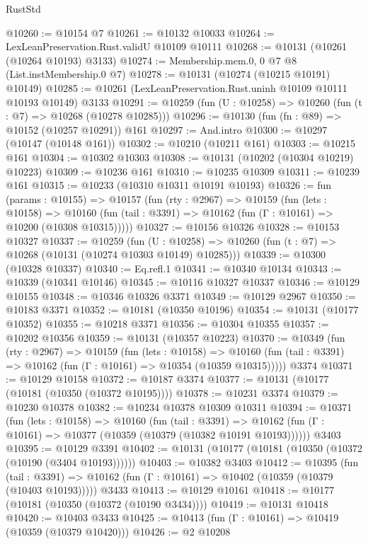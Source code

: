 \begin{lexlean}{RustStd}
\begin{coremodule}
@10260 := @10154 @7
@10261 := @10132 @10033
@10264 := LexLeanPreservation.Rust.validU @10109 @10111
@10268 := @10131 (@10261 (@10264 @10193) @3133)
@10274 := Membership.mem.{0, 0} @7 @8 (List.instMembership.{0} @7)
@10278 := @10131 (@10274 (@10215 @10191) @10149)
@10285 := @10261 (LexLeanPreservation.Rust.uninh @10109 @10111 @10193 @10149) @3133
@10291 := @10259 (fun (U : @10258) => @10260 (fun (t : @7) => @10268 (@10278 @10285)))
@10296 := @10130 (fun (fn : @89) => @10152 (@10257 @10291)) @161
@10297 := And.intro
@10300 := @10297 (@10147 (@10148 @161))
@10302 := @10210 (@10211 @161)
@10303 := @10215 @161
@10304 := @10302 @10303
@10308 := @10131 (@10202 (@10304 @10219) @10223)
@10309 := @10236 @161
@10310 := @10235 @10309
@10311 := @10239 @161
@10315 := @10233 (@10310 @10311 @10191 @10193)
@10326 := fun (params : @10155) =>
  @10157
    (fun (rty : @2967) =>
    @10159
      (fun (lets : @10158) =>
      @10160 (fun (tail : @3391) => @10162 (fun (Γ : @10161) => @10200 (@10308 @10315)))))
@10327 := @10156 @10326
@10328 := @10153 @10327
@10337 := @10259
    (fun (U : @10258) => @10260 (fun (t : @7) => @10268 (@10131 (@10274 @10303 @10149) @10285)))
@10339 := @10300 (@10328 @10337)
@10340 := Eq.refl.{1}
@10341 := @10340 @10134
@10343 := @10339 (@10341 @10146)
@10345 := @10116 @10327 @10337
@10346 := @10129 @10155
@10348 := @10346 @10326 @3371
@10349 := @10129 @2967
@10350 := @10183 @3371
@10352 := @10181 (@10350 @10196)
@10354 := @10131 (@10177 @10352)
@10355 := @10218 @3371
@10356 := @10304 @10355
@10357 := @10202 @10356
@10359 := @10131 (@10357 @10223)
@10370 := @10349
    (fun (rty : @2967) =>
    @10159
      (fun (lets : @10158) =>
      @10160 (fun (tail : @3391) => @10162 (fun (Γ : @10161) => @10354 (@10359 @10315)))))
    @3374
@10371 := @10129 @10158
@10372 := @10187 @3374
@10377 := @10131 (@10177 (@10181 (@10350 (@10372 @10195))))
@10378 := @10231 @3374
@10379 := @10230 @10378
@10382 := @10234 @10378 @10309 @10311
@10394 := @10371
    (fun (lets : @10158) =>
    @10160
      (fun (tail : @3391) =>
      @10162 (fun (Γ : @10161) => @10377 (@10359 (@10379 (@10382 @10191 @10193))))))
    @3403
@10395 := @10129 @3391
@10402 := @10131 (@10177 (@10181 (@10350 (@10372 (@10190 (@3404 @10193))))))
@10403 := @10382 @3403
@10412 := @10395
    (fun (tail : @3391) => @10162 (fun (Γ : @10161) => @10402 (@10359 (@10379 (@10403 @10193)))))
    @3433
@10413 := @10129 @10161
@10418 := @10177 (@10181 (@10350 (@10372 (@10190 @3434))))
@10419 := @10131 @10418
@10420 := @10403 @3433
@10425 := @10413 (fun (Γ : @10161) => @10419 (@10359 (@10379 @10420)))
@10426 := @2 @10208

\end{coremodule}
\end{lexlean}
